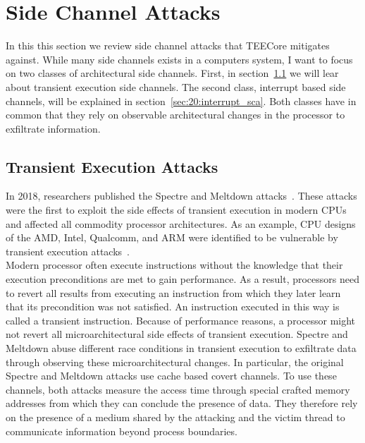 \section{Side Channel Attacks}
\label{sec:20:attacks}
In this this section we review side channel attacks that TEECore mitigates
against. While many side channels exists in a computers system, I want to focus
on two classes of architectural side channels. First, in
section~\ref{sec:20:transientattacks} we will lear about transient execution
side channels. The second class, interrupt based side channels, will be
explained in section~\ref{sec:20:interrupt_sca}. Both classes have in common
that they rely on observable architectural changes in the processor to
exfiltrate information.

\subsection{Transient Execution Attacks}
\label{sec:20:transientattacks}
In 2018, researchers published the Spectre and Meltdown
attacks~\cite{kocher_spectre_2020, lipp_meltdown_2020}. These attacks were the
first to exploit the side effects of transient execution in modern CPUs and
affected all commodity processor architectures. As an example, CPU designs of
the AMD, Intel, Qualcomm, and ARM were identified to be vulnerable by transient
execution attacks~\cite{wikner2022retbleed,moghimi2023downfall,ragab_ghostrace_2024}.\\

Modern processor often execute instructions without the knowledge that their
execution preconditions are met to gain performance. As a result, processors
need to revert all results from executing an instruction from which they later
learn that its precondition was not satisfied. An instruction executed in this
way is called a transient instruction. Because of performance reasons, a
processor might not revert all microarchitectural side effects of transient
execution. Spectre and Meltdown abuse different race conditions in transient
execution to exfiltrate data through observing these microarchitectural changes.
In particular, the original Spectre and Meltdown attacks use cache based covert
channels. To use these channels, both attacks measure the access time through
special crafted memory addresses from which they can conclude the presence of
data. They therefore rely on the presence of a medium shared by the attacking
and the victim thread to communicate information beyond process boundaries. \\

